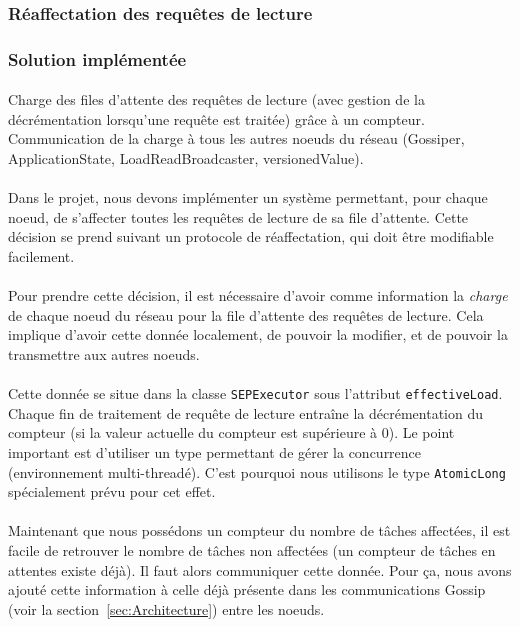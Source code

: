 \documentclass[12pt]{article}
\newcommand{\class}[1]{\texttt{#1}}
\begin{document}
\subsubsection{Réaffectation des requêtes de lecture}

\subsubsection*{Solution implémentée}

\paragraph{}Charge des files d'attente des requêtes de lecture (avec gestion de la décrémentation lorsqu'une requête est traitée) grâce à un compteur. Communication de la charge à tous les autres noeuds du réseau (Gossiper, ApplicationState, LoadReadBroadcaster, versionedValue).

\paragraph{}Dans le projet, nous devons implémenter un système permettant, pour chaque noeud, de s'affecter toutes les requêtes de lecture de sa file d'attente. Cette décision se prend suivant un protocole de réaffectation, qui doit être modifiable facilement.

\paragraph{}Pour prendre cette décision, il est nécessaire d'avoir comme information la \textit{charge} de chaque noeud du réseau pour la file d'attente des requêtes de lecture. Cela implique d'avoir cette donnée localement, de pouvoir la modifier, et de pouvoir la transmettre aux autres noeuds.

\paragraph{}Cette donnée se situe dans la classe \class{SEPExecutor} sous l'attribut \texttt{effectiveLoad}. Chaque fin de traitement de requête de lecture entraîne la décrémentation du compteur (si la valeur actuelle du compteur est supérieure à 0). Le point important est d'utiliser un type permettant de gérer la concurrence (environnement multi-threadé). C'est pourquoi nous utilisons le type \class{AtomicLong} spécialement prévu pour cet effet.

\paragraph{}Maintenant que nous possédons un compteur du nombre de tâches affectées, il est facile de retrouver le nombre de tâches non affectées (un compteur de tâches en attentes existe déjà). Il faut alors communiquer cette donnée. Pour ça, nous avons ajouté cette information à celle déjà présente dans les communications Gossip (voir la section~\ref{sec:Architecture}) entre les noeuds.
\end{document}
